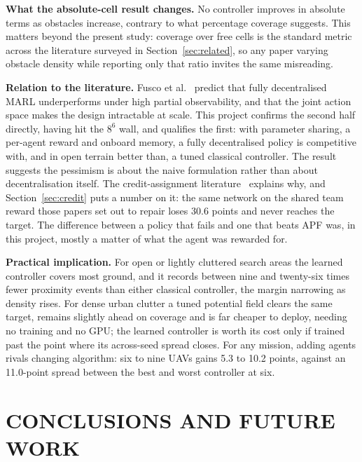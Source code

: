 \documentclass[a4paper, 10pt, conference]{ieeeconf}
\begin{document}
\textbf{What the absolute-cell result changes.} No controller improves
in absolute terms as obstacles increase, contrary to what percentage
coverage suggests. This matters beyond the present study: coverage
over free cells is the standard metric across the literature surveyed
in Section~\ref{sec:related}, so any paper varying obstacle density
while reporting only that ratio invites the same misreading.

\textbf{Relation to the literature.} Fusco et al.~\cite{fusco2025}
predict that fully decentralised MARL underperforms under high partial
observability, and that the joint action space makes the design
intractable at scale. This project confirms the second half directly,
having hit the $8^6$ wall, and qualifies the first: with parameter
sharing, a per-agent reward and onboard memory, a fully decentralised
policy is competitive with, and in open terrain better than, a tuned
classical controller. The result suggests the pessimism is about the
naive formulation rather than about decentralisation itself. The
credit-assignment
literature~\cite{foerster2018,sunehag2018,rashid2018} explains why,
and Section~\ref{sec:credit} puts a number on it: the same network on
the shared team reward those papers set out to repair loses 30.6
points and never reaches the target. The difference between a policy
that fails and one that beats APF was, in this project, mostly a
matter of what the agent was rewarded for.

\textbf{Practical implication.} For open or lightly cluttered search
areas the learned controller covers most ground, and it records
between nine and twenty-six times fewer proximity events than either
classical controller, the margin narrowing as density rises. For dense
urban clutter a tuned potential field clears the same target, remains
slightly ahead on coverage and is far cheaper to deploy, needing no
training and no GPU; the learned controller is worth its cost only if
trained past the point where its across-seed spread closes. For any
mission, adding agents rivals changing algorithm: six to nine UAVs
gains 5.3 to 10.2 points, against an 11.0-point spread between the
best and worst controller at six.

\section{CONCLUSIONS AND FUTURE WORK}\label{sec:conclusion}
\end{document}
